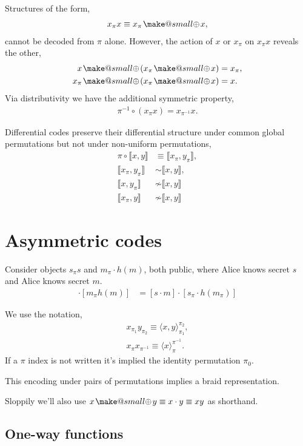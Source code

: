 \documentclass[twocolumn, aps, amsmath, amssymb, nofootinbib, superscriptaddress, longbibliography, doublefloatfix, table-of-contents, eqsecnum, rmp]{revtex4-2}
\makeatletter
\def\diff#1#2{\llbracket #1,#2\rrbracket}
\def\braid#1#2#3#4{\langle#1,#2\rangle_{#3}^{#4}}
\def\selfbraid#1#2#3{\langle#1\rangle_{#2}^{#3}}
\newcommand{\soplus}{{{\hspace{1pt}}{\mathbin{\mathpalette\make@small\oplus}}}{\hspace{1pt}}}
\newcommand{\make@small}[2]{%
  \vcenter{\hbox{%
    \scalebox{0.6}{$\m@th#1#2$}%
  }}%
}
\makeatother
\begin{document}
Structures of the form,
\begin{align}
	x_\pi x \equiv x_\pi \soplus x,
\end{align}
cannot be decoded from $\pi$ alone. However, the action of $x$ or $x_\pi$ on $x_\pi x$ reveals the other,
\begin{align}
	x \soplus (x_\pi \soplus x) & = x_\pi,\nonumber\\
	x_\pi \soplus (x_\pi \soplus x) &= x.
\end{align}
Via distributivity we have the additional symmetric property,
\begin{align}
	\pi^{-1} \circ (x_\pi x)	 = x_{\pi^{-1}} x.
\end{align}

Differential codes preserve their differential structure under common global permutations but not under non-uniform permutations,
\begin{align}
	\pi\circ \diff{x}{y}	 &\equiv \diff{x_\pi}{y_\pi},\nonumber\\
 	\diff{x_\pi}{y_\pi} &\sim \diff{x}{y},\nonumber\\
	\diff{x}{y_\pi} &\not\sim \diff{x}{y} \nonumber\\
	\diff{x_\pi}{y} &\not\sim \diff{x}{y}
\end{align}

\section{Asymmetric codes}

Consider objects $s_\pi s$ and $m_\pi \cdot h(m)$, both public, where Alice knows secret $s$ and Alice knows secret $m$.
\begin{align}
	[s_\pi s] \cdot [m_\pi h(m)] &= [s \cdot m] \cdot [s_\pi \cdot h(m_\pi)]
\end{align}


We use the notation,
\begin{align}
	x_{\pi_1} y_{\pi_2} \equiv \braid{x}{y}{\pi_1}{\pi_2},\nonumber\\
	x_{\pi} x_{\pi^{-1}} \equiv \selfbraid{x}{\pi}{\pi^{-1}}.
\end{align}
If a $\pi$ index is not written it's implied the identity permutation $\pi_0$.

This encoding under pairs of permutations implies a braid representation.

Sloppily we'll also use $x\soplus y \equiv x \cdot y \equiv xy$ as shorthand.

\subsection{One-way functions}
\end{document}
